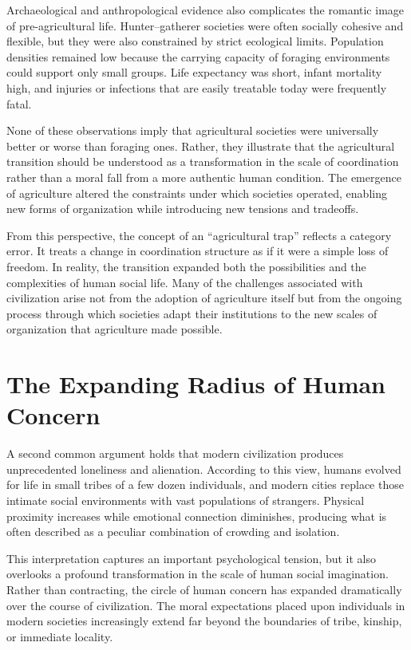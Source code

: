 \documentclass[12pt]{article}
\begin{document}
Archaeological and anthropological evidence also complicates the romantic image of pre-agricultural life. Hunter--gatherer societies were often socially cohesive and flexible, but they were also constrained by strict ecological limits. Population densities remained low because the carrying capacity of foraging environments could support only small groups. Life expectancy was short, infant mortality high, and injuries or infections that are easily treatable today were frequently fatal.

None of these observations imply that agricultural societies were universally better or worse than foraging ones. Rather, they illustrate that the agricultural transition should be understood as a transformation in the scale of coordination rather than a moral fall from a more authentic human condition. The emergence of agriculture altered the constraints under which societies operated, enabling new forms of organization while introducing new tensions and tradeoffs.

From this perspective, the concept of an ``agricultural trap'' reflects a category error. It treats a change in coordination structure as if it were a simple loss of freedom. In reality, the transition expanded both the possibilities and the complexities of human social life. Many of the challenges associated with civilization arise not from the adoption of agriculture itself but from the ongoing process through which societies adapt their institutions to the new scales of organization that agriculture made possible.

\section{The Expanding Radius of Human Concern}

A second common argument holds that modern civilization produces unprecedented loneliness and alienation. According to this view, humans evolved for life in small tribes of a few dozen individuals, and modern cities replace those intimate social environments with vast populations of strangers. Physical proximity increases while emotional connection diminishes, producing what is often described as a peculiar combination of crowding and isolation.

This interpretation captures an important psychological tension, but it also overlooks a profound transformation in the scale of human social imagination. Rather than contracting, the circle of human concern has expanded dramatically over the course of civilization. The moral expectations placed upon individuals in modern societies increasingly extend far beyond the boundaries of tribe, kinship, or immediate locality.
\end{document}

